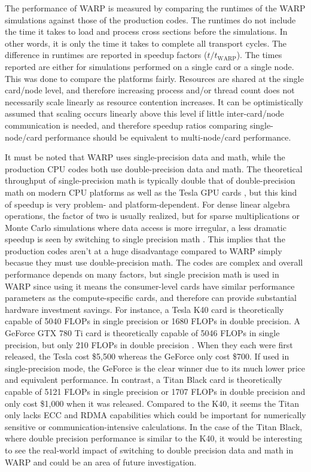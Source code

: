 \documentclass[preprint,12pt]{elsarticle}
\begin{document}
The performance of WARP is measured by comparing the runtimes of the WARP simulations against those of the production codes.  The runtimes do not include the time it takes to load and process cross sections before the simulations.  In other words, it is only the time it takes to complete all transport cycles.  The difference in runtimes are reported in speedup factors ($t/t_\mathrm{WARP}$).  The times reported are either for simulations performed on a single card or a single node.  This was done to compare the platforms fairly.  Resources are shared at the single card/node level, and therefore increasing process and/or thread count does not necessarily scale linearly as resource contention increases.  It can be optimistically assumed that scaling occurs linearly above this level if little inter-card/node communication is needed, and therefore speedup ratios comparing single-node/card performance should be equivalent to multi-node/card performance.

It must be noted that WARP uses single-precision data and math, while the production CPU codes both use double-precision data and math.  The theoretical throughput of single-precision math is typically double that of double-precision math on modern CPU platforms as well as the Tesla GPU cards \cite{cuda,double_single_compare_matrix,double_single_compare_gpu}, but this kind of speedup is very problem- and platform-dependent.  For dense linear algebra operations, the factor of two is usually realized, but for sparse multiplications or Monte Carlo simulations where data access is more irregular, a less dramatic speedup is seen by switching to single precision math \cite{single_cpu2,single_cpu3,Buttari2008UsingMP,chan_mic}.  This implies that the production codes aren't at a huge disadvantage compared to WARP simply becasue they must use double-precision math.  The codes are complex and overall performance depends on many factors, but single precision math is used in WARP since using it means the consumer-level cards have similar performance parameters as the compute-specific cards, and therefore can provide substantial hardware investment savings.  For instance, a Tesla K40 card is theoretically capable of 5040 FLOPs in single precision or 1680 FLOPs in double precision.  A GeForce GTX 780 Ti card is theoretically capable of 5046 FLOPs in single precision, but only 210 FLOPs in double precision \cite{wiki_nvidia}.  When they each were first released, the Tesla cost \$5,500 whereas the GeForce only cost \$700.  If used in single-precision mode, the GeForce is the clear winner due to its much lower price and equivalent performance.  In contrast, a Titan Black card is theoretically capable of 5121 FLOPs in single precision or 1707 FLOPs in double precision and only cost \$1,000 when it was released.  Compared to the K40, it seems the Titan only lacks ECC and RDMA capabilities which could be important for numerically sensitive or communication-intensive calculations.  In the case of the Titan Black, where double precision performance is similar to the K40, it would be interesting to see the real-world impact of switching to double precision data and math in WARP and could be an area of future investigation.
\end{document}
